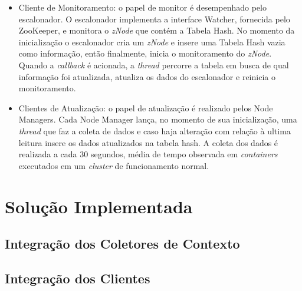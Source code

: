 \begin{itemize}
	\item Cliente de Monitoramento: o papel de monitor é desempenhado pelo escalonador. O escalonador implementa a interface Watcher, fornecida pelo ZooKeeper, e monitora o \textit{zNode} que contém a Tabela Hash. No momento da inicialização o escalonador cria um \textit{zNode} e insere uma Tabela Hash vazia como informação, então finalmente, inicia o monitoramento do \textit{zNode}. Quando a \textit{callback} é acionada, a \textit{thread} percorre a tabela em busca de qual informação foi atualizada, atualiza os dados do escalonador e reinicia o monitoramento.
	
	\item Clientes de Atualização: o papel de atualização é realizado pelos Node Managers. Cada Node Manager lança, no momento de sua inicialização, uma \textit{thread} que faz a coleta de dados e caso haja alteração com relação à ultima leitura insere os dados atualizados na tabela hash. A coleta dos dados é realizada a cada 30 segundos, média de tempo observada em \textit{containers} executados em um \textit{cluster} de funcionamento normal.
	
\end{itemize}

\section{Solução Implementada}
\label{sec:solucao}


\subsection{Integração dos Coletores de Contexto}

\subsection{Integração dos Clientes}
